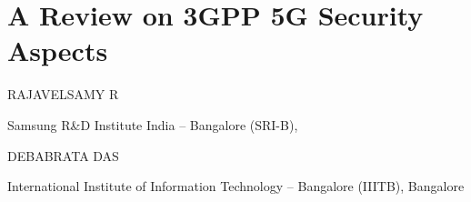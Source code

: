 \chapter{A Review on 3GPP 5G Security Aspects}

\begin{center}
{\large\uppercase{Rajavelsamy R}} 

\vskip -6pt

Samsung R\&D Institute India – Bangalore (SRI-B),

\bigskip
{\large\uppercase{Debabrata Das}} 

\vskip -6pt

International Institute of Information Technology – Bangalore (IIITB), Bangalore
\end{center}

\newpage

